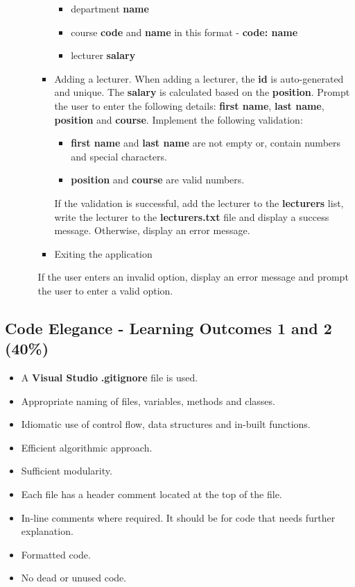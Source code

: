 \documentclass{article}
\begin{document}
\begin{itemize}
\begin{itemize}
\begin{itemize}
\begin{itemize}
                \item department \textbf{name}
                \item course \textbf{code} and \textbf{name} in this format - \textbf{code: name}
                \item lecturer \textbf{salary}
            \end{itemize}
            \item Adding a lecturer. When adding a lecturer, the \textbf{id} is auto-generated and unique. The \textbf{salary} is calculated based on the \textbf{position}. Prompt the user to enter the following details: \textbf{first name}, \textbf{last name}, \textbf{position} and \textbf{course}. Implement the following validation:
            \begin{itemize}
                \item \textbf{first name} and \textbf{last name} are not empty or, contain numbers and special characters.
                \item \textbf{position} and \textbf{course} are valid numbers.
            \end{itemize}
            If the validation is successful, add the lecturer to the \textbf{lecturers} list, write the lecturer to the \textbf{lecturers.txt} file and display a success message. Otherwise, display an error message.
            \item Exiting the application
        \end{itemize} 
        If the user enters an invalid option, display an error message and prompt the user to enter a valid option.
    \end{itemize}
\end{itemize}

\subsection*{Code Elegance - Learning Outcomes 1 and 2 (40\%)}
\begin{itemize}
    \item A \textbf{Visual Studio} \textbf{.gitignore} file is used. 
    \item Appropriate naming of files, variables, methods and classes.
    \item Idiomatic use of control flow, data structures and in-built functions.
    \item Efficient algorithmic approach.
    \item Sufficient modularity.
    \item Each file has a header comment located at the top of the file.
    \item In-line comments where required. It should be for code that needs further explanation.
    \item Formatted code.
    \item No dead or unused code.
\end{itemize}
\end{document}
